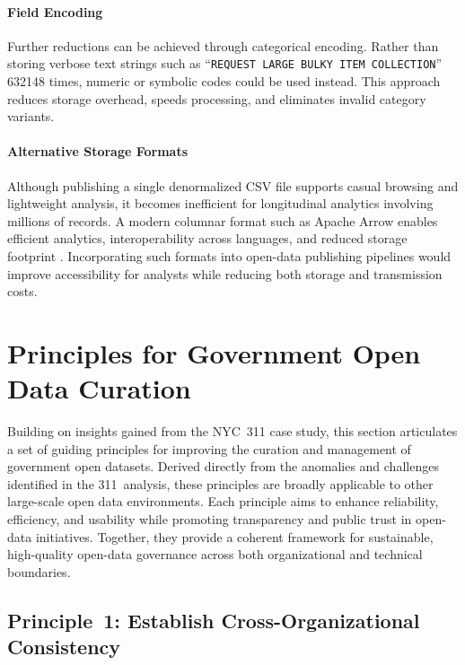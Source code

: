 \documentclass[linenumber]{jdsart}
\newcommand{\numint}[1]{\num[round-mode=none]{#1}}
\begin{document}
\paragraph{Field Encoding}
Further reductions can be achieved through categorical encoding. Rather than
storing verbose text strings such as
“\texttt{REQUEST LARGE BULKY ITEM COLLECTION}” \numint{632148} times, numeric or symbolic
codes could be used instead. This approach reduces storage overhead, speeds
processing, and eliminates invalid category variants.

\paragraph{Alternative Storage Formats}
Although publishing a single denormalized CSV file supports casual
browsing and lightweight analysis, it becomes inefficient for longitudinal
analytics involving millions of records. A modern columnar format such as
Apache Arrow enables efficient analytics, interoperability across languages,
and reduced storage footprint \citep{bates2024csv}. Incorporating such
formats into open-data publishing pipelines would improve accessibility for
analysts while reducing both storage and transmission costs.



\section{Principles for Government Open Data Curation}
\label{sec:principles}

Building on insights gained from the NYC~311 case study, this section
articulates a set of guiding principles for improving the curation and
management of government open datasets. Derived directly from the anomalies and
challenges identified in the 311~analysis, these principles are broadly
applicable to other large-scale open data environments. Each principle aims to
enhance reliability, efficiency, and usability while promoting transparency and
public trust in open-data initiatives. Together, they provide a coherent
framework for sustainable, high-quality open-data governance across both
organizational and technical boundaries.

\subsection{Principle~1: Establish Cross-Organizational Consistency}
\label{subsec:principle1}
\end{document}
